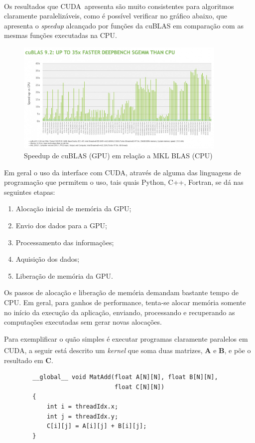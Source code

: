 \documentclass[cic,tc]{iiufrgs}
\newcommand{\mat}[1]{\bm{#1}}
\newcommand{\reg}{\textsuperscript{\textregistered}}
\begin{document}
Os resultados que CUDA\reg~apresenta são muito consistentes para algoritmos claramente
paralelizáveis, como é possível verificar no gráfico abaixo, que apresenta o 
\emph{speedup} alcançado por funções da cuBLAS em comparação com as mesmas funções 
executadas na CPU.
\begin{figure}[H]
    \caption{Speedup de cuBLAS (GPU) em relação a MKL BLAS (CPU)}
    \begin{center}
        \includegraphics[width=0.9\textwidth]{img/cublas9_2.png}
    \end{center}
\end{figure}


Em geral o uso da interface com CUDA, através de alguma das linguagens de programação 
que permitem o uso, tais quais Python, C++, Fortran, se dá nas seguintes etapas:
\begin{enumerate}
    \item Alocação inicial de memória da GPU;
    \item Envio dos dados para a GPU;
    \item Processamento das informações;
    \item Aquisição dos dados;
    \item Liberação de memória da GPU.
\end{enumerate}

Os passos de alocação e liberação de memória demandam bastante tempo de CPU.
Em geral, para ganhos de performance, tenta-se alocar memória somente no início da
execução da aplicação, enviando, processando e recuperando as computações executadas 
sem gerar novas alocações.

Para exemplificar o quão simples é executar programas claramente paralelos em 
CUDA\reg, a seguir está descrito um \textit{kernel} que soma duas matrizes,
$\mat{A}$ e $\mat{B}$, e põe o resultado em $\mat{C}$.
\begin{center}
    \begin{lstlisting}
        __global__ void MatAdd(float A[N][N], float B[N][N],
                               float C[N][N])
        {
            int i = threadIdx.x;
            int j = threadIdx.y;
            C[i][j] = A[i][j] + B[i][j];
        }
        \end{lstlisting}
\end{center}
\end{document}
